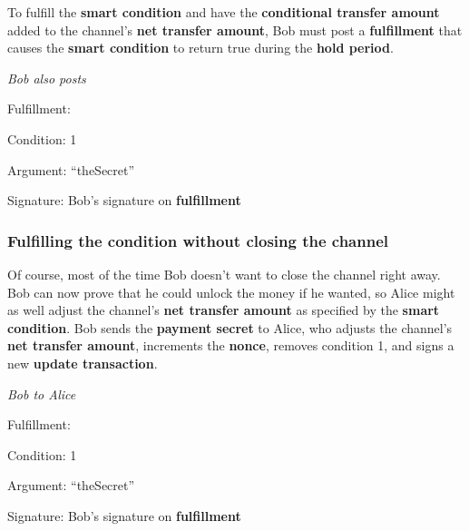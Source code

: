 \documentclass[a4paper]{article}
\newcommand{\bgls}[1]{\textbf{\gls{#1}}}
\newenvironment{mydescription}
{\begin{description}
  \setlength{\itemsep}{5pt}
    \setlength{\parskip}{0pt}
    \setlength{\labelsep}{5pt}
}{
\end{description}}
\begin{document}
To fulfill the \bgls{smart condition} and have the \bgls{conditional transfer amount} added to the channel's \bgls{net transfer amount}, Bob must post a \bgls{fulfillment} that causes the \bgls{smart condition} to return true during the \bgls{hold period}.

\begin{mdframed}[style=message]{\emph{Bob also posts}}
  \begin{mydescription}
    \item[Fulfillment:] \hfill \begin{mydescription}
      \item[Condition:] 1
      \item[Argument:] ``theSecret''
    \end{mydescription}
    \item[Signature:] Bob's signature on \bgls{fulfillment}
  \end{mydescription}
\end{mdframed}

\subsubsection{Fulfilling the condition without closing the channel}

Of course, most of the time Bob doesn't want to close the channel right away. Bob can now prove that he could unlock the money if he wanted, so Alice might as well adjust the channel's \bgls{net transfer amount} as specified by the \bgls{smart condition}. Bob sends the \bgls{payment secret} to Alice, who adjusts the channel's \bgls{net transfer amount}, increments the \bgls{nonce}, removes condition 1, and signs a new \bgls{update transaction}.

\begin{mdframed}[style=message]{\emph{Bob to Alice}}
\begin{mydescription}
  \item[Fulfillment:] \hfill
  \begin{mydescription}
    \item[Condition:] 1
    \item[Argument:] ``theSecret''
  \end{mydescription}
  \item[Signature:] Bob's signature on \bgls{fulfillment}
\end{mydescription}
\end{mdframed}
\end{document}
